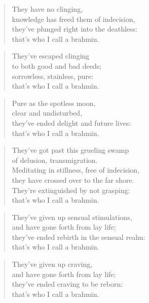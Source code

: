 \documentclass[12pt,openany]{book}%
\begin{document}
\begin{verse}%
They have no clinging, \\
knowledge has freed them of indecision, \\
they’ve plunged right into the deathless: \\
that’s who I call a brahmin. 

%
\end{verse}

\begin{verse}%
They’ve escaped clinging \\
to both good and bad deeds; \\
sorrowless, stainless, pure: \\
that’s who I call a brahmin. 

%
\end{verse}

\begin{verse}%
Pure as the spotless moon, \\
clear and undisturbed, \\
they’ve ended delight and future lives: \\
that’s who I call a brahmin. 

%
\end{verse}

\begin{verse}%
They’ve got past this grueling swamp \\
of delusion, transmigration. \\
Meditating in stillness, free of indecision, \\
they have crossed over to the far shore. \\
They’re extinguished by not grasping: \\
that’s who I call a brahmin. 

%
\end{verse}

\begin{verse}%
They’ve given up sensual stimulations, \\
and have gone forth from lay life; \\
they’ve ended rebirth in the sensual realm: \\
that’s who I call a brahmin. 

%
\end{verse}

\begin{verse}%
They’ve given up craving, \\
and have gone forth from lay life; \\
they’ve ended craving to be reborn: \\
that’s who I call a brahmin. 

%
\end{verse}
\end{document}
